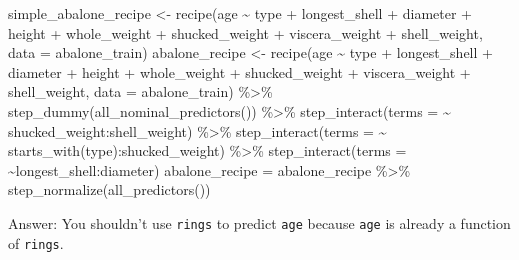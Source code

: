 \documentclass[
]{article}
\newenvironment{Shaded}{\begin{snugshade}}{\end{snugshade}}
\newcommand{\AttributeTok}[1]{\textcolor[rgb]{0.77,0.63,0.00}{#1}}
\newcommand{\FunctionTok}[1]{\textcolor[rgb]{0.00,0.00,0.00}{#1}}
\newcommand{\NormalTok}[1]{#1}
\newcommand{\OtherTok}[1]{\textcolor[rgb]{0.56,0.35,0.01}{#1}}
\newcommand{\SpecialCharTok}[1]{\textcolor[rgb]{0.00,0.00,0.00}{#1}}
\newcommand{\StringTok}[1]{\textcolor[rgb]{0.31,0.60,0.02}{#1}}
\begin{document}
\begin{Shaded}
\begin{Highlighting}[]
\NormalTok{simple\_abalone\_recipe }\OtherTok{\textless{}{-}} \FunctionTok{recipe}\NormalTok{(age }\SpecialCharTok{\textasciitilde{}}\NormalTok{ type }\SpecialCharTok{+}\NormalTok{ longest\_shell }\SpecialCharTok{+}\NormalTok{ diameter }\SpecialCharTok{+}\NormalTok{ height }\SpecialCharTok{+}\NormalTok{ whole\_weight }
                                \SpecialCharTok{+}\NormalTok{ shucked\_weight }\SpecialCharTok{+}\NormalTok{ viscera\_weight }\SpecialCharTok{+}\NormalTok{ shell\_weight, }\AttributeTok{data =}\NormalTok{ abalone\_train)}
\NormalTok{abalone\_recipe }\OtherTok{\textless{}{-}} \FunctionTok{recipe}\NormalTok{(age }\SpecialCharTok{\textasciitilde{}}\NormalTok{ type }\SpecialCharTok{+}\NormalTok{ longest\_shell }\SpecialCharTok{+}\NormalTok{ diameter }\SpecialCharTok{+}\NormalTok{ height }\SpecialCharTok{+}\NormalTok{ whole\_weight }\SpecialCharTok{+}\NormalTok{ shucked\_weight}
                         \SpecialCharTok{+}\NormalTok{ viscera\_weight }\SpecialCharTok{+}\NormalTok{ shell\_weight, }\AttributeTok{data =}\NormalTok{ abalone\_train) }\SpecialCharTok{\%\textgreater{}\%} 
                         \FunctionTok{step\_dummy}\NormalTok{(}\FunctionTok{all\_nominal\_predictors}\NormalTok{()) }\SpecialCharTok{\%\textgreater{}\%} 
                         \FunctionTok{step\_interact}\NormalTok{(}\AttributeTok{terms =} \SpecialCharTok{\textasciitilde{}}\NormalTok{ shucked\_weight}\SpecialCharTok{:}\NormalTok{shell\_weight) }\SpecialCharTok{\%\textgreater{}\%} 
                         \FunctionTok{step\_interact}\NormalTok{(}\AttributeTok{terms =} \SpecialCharTok{\textasciitilde{}} \FunctionTok{starts\_with}\NormalTok{(}\StringTok{\textquotesingle{}type\textquotesingle{}}\NormalTok{)}\SpecialCharTok{:}\NormalTok{shucked\_weight) }\SpecialCharTok{\%\textgreater{}\%}
                         \FunctionTok{step\_interact}\NormalTok{(}\AttributeTok{terms =} \SpecialCharTok{\textasciitilde{}}\NormalTok{longest\_shell}\SpecialCharTok{:}\NormalTok{diameter)}
\NormalTok{abalone\_recipe }\OtherTok{=}\NormalTok{ abalone\_recipe }\SpecialCharTok{\%\textgreater{}\%} \FunctionTok{step\_normalize}\NormalTok{(}\FunctionTok{all\_predictors}\NormalTok{())}
\end{Highlighting}
\end{Shaded}

Answer: You shouldn't use \texttt{rings} to predict \texttt{age} because
\texttt{age} is already a function of \texttt{rings}.
\end{document}
